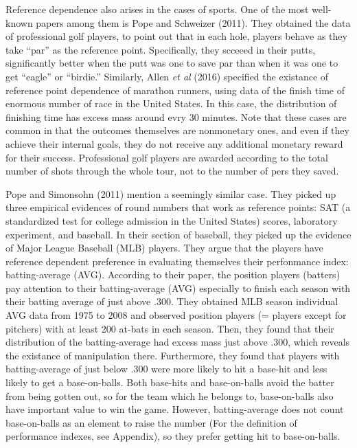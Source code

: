 \documentclass[dvipdfmx, 12pt]{article}
\begin{document}
\vspace{1zw}


Reference dependence also arises in the cases of sports. One of the most well-known papers among them is Pope and Schweizer (2011). They obtained the data of professional golf players, to point out that in each hole, players behave as they take ``par'' as the reference point. Specifically, they scceeed in their putts, significantly better when the putt was one to save par than when it was one to get ``eagle'' or ``birdie.'' Similarly, Allen \textit{et al} (2016) specified the existance of reference point dependence of marathon runners, using data of the finish time of enormous number of race in the United States. In this case, the distribution of finishing time has excess mass around evry 30 minutes. Note that these cases are common in that the outcomes themselves are nonmonetary ones, and even if they achieve their internal goals, they do not receive any additional monetary reward for their success. Professional golf players are awarded according to the total number of shots through the whole tour, not to the number of pers they saved.

Pope and Simonsohn (2011) mention a seemingly similar case. They picked up three empirical evidences of round numbers that work as reference points: SAT (a standardized test for college admission in the United States) scores, laboratory experiment, and baseball. In their section of baseball, they picked up the evidence of Major League Baseball (MLB) players. They argue that the players have reference dependent preference in evaluating themselves their perfonmance index: batting-average (AVG). According to their paper, the position players (batters) pay attention to their batting-average (AVG) especially to finish each season with their batting average of just above .300. They obtained MLB season individual AVG data from 1975 to 2008 and observed position players (= players except for pitchers) with at least 200 at-bats in each season. Then, they found that their distribution of the batting-average had excess mass just above .300, which reveals the existance of manipulation there. Furthermore, they found that players with batting-average of just below .300 were more likely to hit a base-hit and less likely to get a base-on-balls. Both base-hits and base-on-balls avoid the batter from being gotten out, so for the team which he belongs to, base-on-balls also have important value to win the game. However, batting-average does not count base-on-balls as an element to raise the number (For the definition of performance indexes, see Appendix), so they prefer getting hit to base-on-balls.
\end{document}
